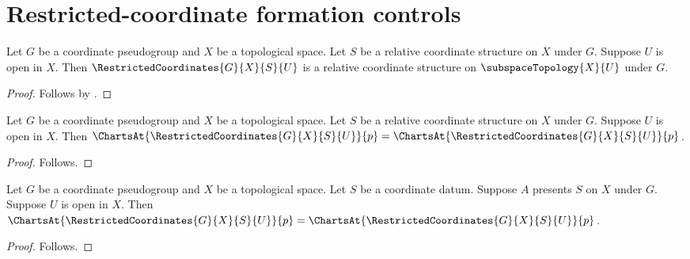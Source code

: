 \section{Restricted-coordinate formation controls}



\begin{theorem}\label{restricted_coordinates_result_control}
    Let $G$ be a coordinate pseudogroup and $X$ be a topological space.
    Let $S$ be a relative coordinate structure on $X$ under $G$.
    Suppose $U$ is open in $X$.
    Then $\RestrictedCoordinates{G}{X}{S}{U}$ is a relative coordinate structure
        on $\subspaceTopology{X}{U}$ under $G$.
\end{theorem}
\begin{proof}
    Follows by .
\end{proof}

\begin{theorem}\label{restricted_coordinates_charts_at_control}
    Let $G$ be a coordinate pseudogroup and $X$ be a topological space.
    Let $S$ be a relative coordinate structure on $X$ under $G$.
    Suppose $U$ is open in $X$.
    Then $\ChartsAt{\RestrictedCoordinates{G}{X}{S}{U}}{p}
        =\ChartsAt{\RestrictedCoordinates{G}{X}{S}{U}}{p}$.
\end{theorem}
\begin{proof}
    Follows.
\end{proof}

\begin{theorem}\label{presented_restricted_coordinates_charts_at_probe}
    Let $G$ be a coordinate pseudogroup and $X$ be a topological space.
    Let $S$ be a coordinate datum.
    Suppose $A$ presents $S$ on $X$ under $G$.
    Suppose $U$ is open in $X$.
    Then $\ChartsAt{\RestrictedCoordinates{G}{X}{S}{U}}{p}
        =\ChartsAt{\RestrictedCoordinates{G}{X}{S}{U}}{p}$.
\end{theorem}
\begin{proof}
    Follows.
\end{proof}
